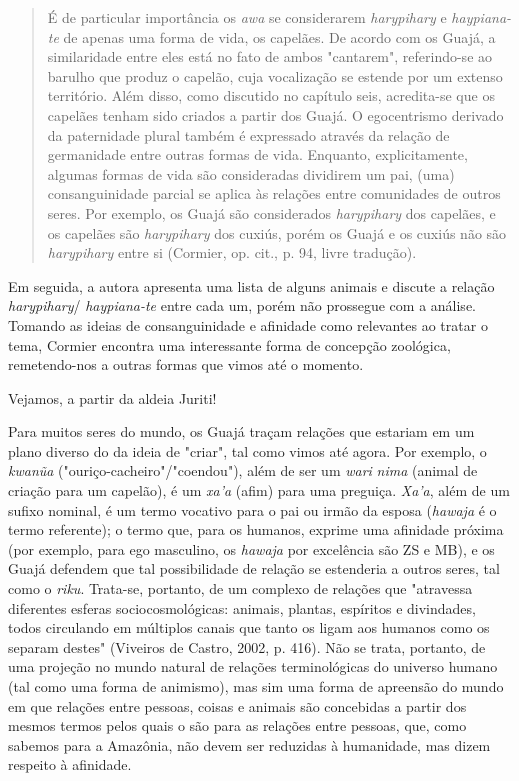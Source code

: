\begin{quote}
É de particular importância os \emph{awa} se considerarem
\emph{harypihary} e \emph{haypiana-te} de apenas uma forma de vida, os
capelães. De acordo com os Guajá, a similaridade entre eles está no fato
de ambos "cantarem", referindo-se ao barulho que produz o capelão, cuja
vocalização se estende por um extenso território. Além disso, como
discutido no capítulo seis, acredita-se que os capelães tenham sido
criados a partir dos Guajá. O egocentrismo derivado da paternidade
plural também é expressado através da relação de germanidade entre
outras formas de vida. Enquanto, explicitamente, algumas formas de vida
são consideradas dividirem um pai, (uma) consanguinidade parcial se
aplica às relações entre comunidades de outros seres. Por exemplo, os
Guajá são considerados \emph{harypihary} dos capelães, e os capelães são
\emph{harypihary} dos cuxiús, porém os Guajá e os cuxiús não são
\emph{harypihary} entre si (Cormier, op. cit., p. 94, livre tradução).
\end{quote}

Em seguida, a autora apresenta uma lista de alguns animais e discute a
relação \emph{harypihary}/ \emph{haypiana-te} entre cada um, porém não
prossegue com a análise. Tomando as ideias de consanguinidade e
afinidade como relevantes ao tratar o tema, Cormier encontra uma
interessante forma de concepção zoológica, remetendo-nos a outras formas
que vimos até o momento.

Vejamos, a partir da aldeia Juriti!

Para muitos seres do mundo, os Guajá traçam relações que estariam em um
plano diverso do da ideia de "criar", tal como vimos até agora. Por
exemplo, o \emph{kwanũa} ("ouriço-cacheiro"/"coendou"), além de ser um
\emph{wari} \emph{nima} (animal de criação para um capelão), é um
\emph{xa'a} (afim) para uma preguiça. \emph{Xa'a}, além de um sufixo
nominal, é um termo vocativo para o pai ou irmão da esposa
(\emph{hawaja} é o termo referente); o termo que, para os humanos,
exprime uma afinidade próxima (por exemplo, para ego masculino, os
\emph{hawaja} por excelência são ZS e MB), e os Guajá defendem que tal
possibilidade de relação se estenderia a outros seres, tal como o
\emph{riku}. Trata-se, portanto, de um complexo de relações que
"atravessa diferentes esferas sociocosmológicas: animais, plantas,
espíritos e divindades, todos circulando em múltiplos canais que tanto
os ligam aos humanos como os separam destes" (Viveiros de Castro, 2002,
p. 416). Não se trata, portanto, de uma projeção no mundo natural de
relações terminológicas do universo humano (tal como uma forma de
animismo), mas sim uma forma de apreensão do mundo em que relações entre
pessoas, coisas e animais são concebidas a partir dos mesmos termos
pelos quais o são para as relações entre pessoas, que, como sabemos para
a Amazônia, não devem ser reduzidas à humanidade, mas dizem respeito à
afinidade.

